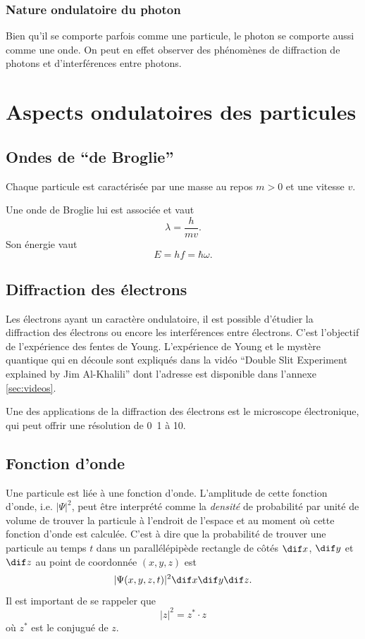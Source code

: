 \subsubsection{Nature ondulatoire du photon}
Bien qu'il se comporte parfois comme une particule,
le photon se comporte aussi comme une onde. On peut
en effet observer des phénomènes de diffraction de photons
et d'interférences entre photons.

\section{Aspects ondulatoires des particules}
\subsection{Ondes de ``de Broglie''}
Chaque particule est caractérisée par une masse au repos $m > 0$
et une vitesse $v$.

Une onde de Broglie lui est associée et vaut
\[ \lambda = \frac{h}{mv}. \]
Son énergie vaut
\[ E = hf = \hbar \omega. \]

\subsection{Diffraction des électrons}
Les électrons ayant un caractère ondulatoire, il
est possible d'étudier la diffraction des électrons
ou encore les interférences entre électrons. C'est l'objectif
de l'expérience des fentes de Young. L'expérience de
Young et le mystère quantique qui en découle sont
expliqués dans la vidéo ``Double Slit Experiment explained
by Jim Al-Khalili'' dont l'adresse est disponible dans
l'annexe \ref{sec:videos}.

Une des applications de la diffraction des électrons est
le microscope électronique, qui peut offrir une résolution
de \unit{0.1}{\nano\meter} à \unit{10}{\nano\meter}.

\subsection{Fonction d'onde}
Une particule est liée à une fonction d'onde.
L'amplitude de cette fonction d'onde, i.e. $|\Psi|^2$, peut être interprété
comme la \emph{densité} de probabilité par unité de volume de trouver
la particule à l'endroit de l'espace et au moment où cette fonction
d'onde est calculée.
C'est à dire que la probabilité de trouver une particule
au temps $t$ dans un parallélépipède rectangle de côtés
$\dif x$, $\dif y$ et $\dif z$ au point de coordonnée $(x, y, z)$ est
\[ |\Psi(x, y, z, t)|^2 \dif x \dif y \dif z .\]
Il est important de se rappeler que
\[ |z|^2 = z^{*} \cdot z \]
où $z^{*}$ est le conjugué de $z$.

